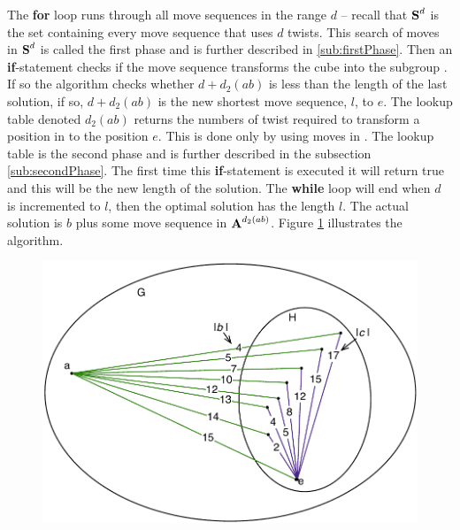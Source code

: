 The \textbf{for} loop runs through all move sequences in the range $d$ -- recall that $\textbf{S}^d$ is the set containing every move sequence that uses $d$ twists. This search of moves in $\textbf{S}^d$ is called the first phase and is further described in \ref{sub:firstPhase}.
Then an \textbf{if}-statement checks if the move sequence transforms the cube into the subgroup . If so the algorithm checks whether $d + d_2(ab)$ is less than the length of the last solution, if so, $d + d_2(ab)$ is the new shortest move sequence, $l$, to $e$. 
The lookup table denoted $d_2(ab)$ returns the numbers of twist required to transform a position in  to the position $e$. This is done only by using moves in . %
The lookup table is the second phase and is further described in the subsection \ref{sub:secondPhase}. 
The first time this \textbf{if}-statement is executed it will return true and this will be the new length of the solution. The \textbf{while} loop will end when $d$ is incremented to $l$, then the optimal solution has the length $l$. The actual solution is $b$ plus some move sequence in $\textbf{A}^{d_{2}(ab)}$. Figure \ref{fig:kociemba2} illustrates the algorithm.
\begin{figure}[!htb]
	\centering
	\includegraphics[scale=0.75]{input/pics/kocieambe2.pdf}
	\caption{}
	\label{fig:kociemba2}
\end{figure}

